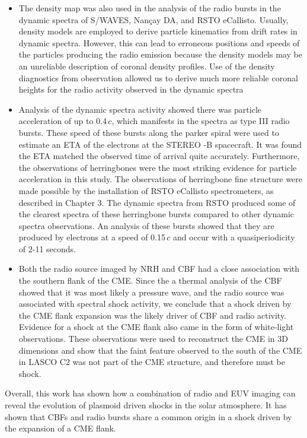 \begin{itemize}
\item The density map was also used in the analysis of the radio bursts in the dynamic spectra of S/WAVES, Nan\c{c}ay DA, and RSTO eCallisto. Usually, density models are employed to derive particle kinematics from drift rates in dynamic spectra. However, this can lead to erroneous positions and speeds of the particles producing the radio emission because the density models may be an unreliable description of coronal density profiles. Use of the density diagnostics from observation allowed us to derive much more reliable coronal heights for the radio activity observed in the dynamic spectra
\item Analysis of the dynamic spectra activity showed there was particle acceleration of up to 0.4\,$c$, which manifests in the spectra as type III radio bursts. These speed of these bursts along the parker spiral were used to estimate an ETA of the electrons at the STEREO -B spacecraft. It was found the ETA matched the observed time of arrival quite accurately. Furthermore, the observations of herringbones were the most striking evidence for particle acceleration in this study. The observations of herringbone fine structure were made possible by the installation of RSTO eCallisto spectrometers, as described in Chapter 3. The dynamic spectra from RSTO produced some of the clearest spectra of these herringbone bursts compared to other dynamic spectra observations. An analysis of these bursts showed that they are produced by electrons at a speed of 0.15\,$c$ and occur with a quasiperiodicity of 2-11 seconds.
\item Both the radio source imaged by NRH and CBF had a close association with the southern flank of the CME. Since the a thermal analysis of the CBF showed that it was most likely a pressure wave, and the radio source was associated with spectral shock activity, we conclude that a shock driven by the CME flank expansion was the likely driver of CBF and radio activity. Evidence for a shock at the CME flank also came in the form of white-light observations. These observations were used to reconstruct the CME in 3D dimensions and show that the faint feature observed to the south of the CME in LASCO C2 was not part of the CME structure, and therefore must be shock.
\end{itemize}
Overall, this work has shown how a combination of radio and EUV imaging can reveal the evolution of plasmoid driven shocks in the solar atmosphere. It has shown that CBFs and radio bursts share a common origin in a shock driven by the expansion of a CME flank.

